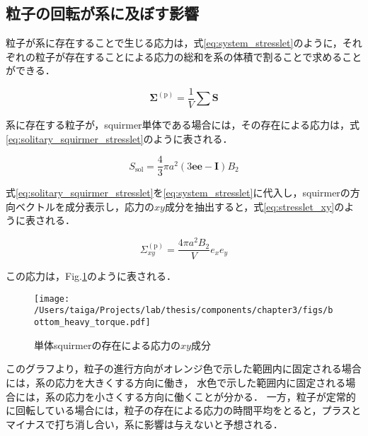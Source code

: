 \subsection{粒子の回転が系に及ぼす影響}
粒子が系に存在することで生じる応力は，式\eqref{eq:system_stresslet}のように，それぞれの粒子が存在することによる応力の総和を系の体積で割ることで求めることができる．

    \begin{equation}
        \boldsymbol{\Sigma}^\mathrm{(p)} = \frac{1}{V} \sum \boldsymbol{S}
        \label{eq:system_stresslet}
    \end{equation}

\noindent
系に存在する粒子が，squirmer単体である場合には，その存在による応力は，式\eqref{eq:solitary_squirmer_stresslet}のように表される．

    \begin{equation}
        S_\mathrm{sol} = \frac{4}{3} \pi a^2 (3 \boldsymbol{ee} - \boldsymbol{I}) B_2
        \label{eq:solitary_squirmer_stresslet}
    \end{equation}

\noindent
式\eqref{eq:solitary_squirmer_stresslet}を\eqref{eq:system_stresslet}に代入し，squirmerの方向ベクトルを成分表示し，応力の$xy$成分を抽出すると，式\eqref{eq:stresslet_xy}のように表される．

    \begin{equation}
        \Sigma^\mathrm{(p)}_{xy} = \frac{4 \pi a^2 B_2}{V} e_x e_y
        \label{eq:stresslet_xy}
    \end{equation}

\noindent
この応力は，Fig.\ref{fig:stresslet_xy}のように表される．

    \begin{figure}[H]
        \centering
        \texttt{[image: /Users/taiga/Projects/lab/thesis/components/chapter3/figs/bottom\_heavy\_torque.pdf]}
        \caption{単体squirmerの存在による応力の$xy$成分}
        \label{fig:stresslet_xy}
    \end{figure}

\noindent
このグラフより，粒子の進行方向がオレンジ色で示した範囲内に固定される場合には，系の応力を大きくする方向に働き，
水色で示した範囲内に固定される場合には，系の応力を小さくする方向に働くことが分かる．
一方，粒子が定常的に回転している場合には，粒子の存在による応力の時間平均をとると，プラスとマイナスで打ち消し合い，系に影響は与えないと予想される．
